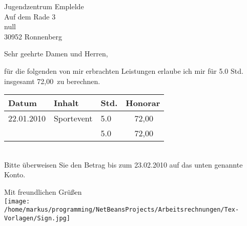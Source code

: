 \documentclass[a4paper,12pt]{scrlttr2}
\begin{document}
\begin{letter}{Jugendzentrum Emplelde\\
Auf dem Rade 3\\
null\\
30952 Ronnenberg}
\opening{Sehr geehrte Damen und Herren,}
für die folgenden von mir erbrachten Leistungen erlaube ich mir  für 5.0 Std. insgesamt 72,00\officialeuro\ 
 zu berechnen.

\begin{tabular}{|l|l|l|r|}\hline 
Datum & Inhalt & Std. & Honorar\\\hline \hline 
22.01.2010 & Sportevent & 5.0 & 72,00 \officialeuro\ \\\hline 
\hline & & 5.0 & 72,00 \officialeuro\ \\\hline 
\end{tabular}\\


Bitte überweisen Sie den Betrag bis zum 23.02.2010
 auf das unten genannte Konto.
\closing{Mit freundlichen Grüßen\\\texttt{[image: /home/markus/programming/NetBeansProjects/Arbeitsrechnungen/Tex-Vorlagen/Sign.jpg]}}


\end{letter}
\end{document}
